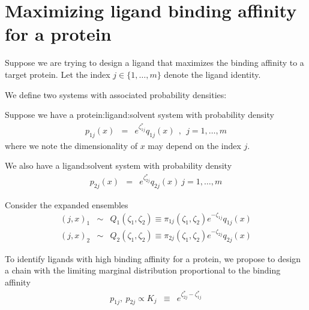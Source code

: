 \documentclass[aps,pre,twocolumn,nofootinbib,superscriptaddress,linenumbers,11point]{revtex4-1}
\begin{document}


\section*{Maximizing ligand binding affinity for a protein}
\label{section:problem-summary}

Suppose we are trying to design a ligand that maximizes the binding affinity to a target protein.
Let the index $j \in \{1, \ldots, m\}$ denote the ligand identity.

We define two systems with associated probability densities:

Suppose we have a protein:ligand:solvent system with probability density
\begin{eqnarray}
p_{1j}(x) &=& e^{\zeta_{1j}^*} q_{1j}(x) \:\:,\:\: j = 1,\ldots, m
\end{eqnarray}
where we note the dimensionality of $x$ may depend on the index $j$.

We also have a ligand:solvent system with probability density
\begin{eqnarray}
p_{2j}(x) &=& e^{\zeta_{2j}^*} q_{2j}(x) \: j = 1,\ldots, m
\end{eqnarray}

Consider the expanded ensembles
\begin{eqnarray}
(j, x)_1 &\sim& Q_1(\zeta_1, \zeta_2) \equiv \pi_{1j}(\zeta_1, \zeta_2) e^{-\zeta_{1j}} q_{1j}(x) \\
(j, x)_2 &\sim& Q_2(\zeta_1, \zeta_2) \equiv \pi_{2j}(\zeta_1, \zeta_2) e^{-\zeta_{2j}} q_{2j}(x)
\end{eqnarray}

To identify ligands with high binding affinity for a protein, we propose to design a chain with the limiting marginal distribution proportional to the binding affinity
\begin{eqnarray}
p_{1j}, \: p_{2j} \propto K_j &\equiv& e^{\zeta_{2j}^* - \zeta_{1j}^*}
\end{eqnarray}
\end{document}
